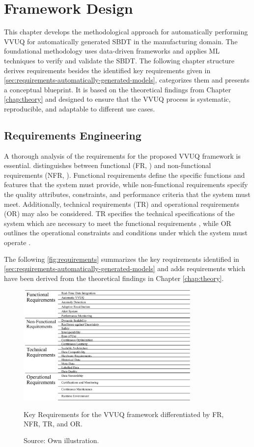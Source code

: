 \chapter{Framework Design}
\label{chap:methodology}
This chapter develops the methodological approach for automatically performing VVUQ for automatically generated SBDT in the manufacturing domain. The foundational methodology uses data-driven frameworks and applies ML techniques to verify and validate the SBDT. The following chapter structure derives requirements besides the identified key requirements given in \autoref{sec:requirements-automatically-generated-models}, categorizes them and presents a conceptual blueprint. It is based on the theoretical findings from Chapter \ref{chap:theory} and designed to ensure that the VVUQ process is systematic, reproducible, and adaptable to different use cases.

\section{Requirements Engineering}
A thorough analysis of the requirements for the proposed VVUQ framework is essential. \Autocite{sindhgatta2005functional} distinguishes between functional (FR, \autocite{van2001goal}) and non-functional requirements (NFR, \autocite{glinz2005rethinking}). Functional requirements define the specific functions and features that the system must provide, while non-functional requirements specify the quality attributes, constraints, and performance criteria that the system must meet. Additionally, technical requirements (TR) and operational requirements (OR) may also be considered. TR specifies the technical specifications of the system which are necessary to meet the functional requirements \autocite{chikh2012new}, while OR outlines the operational constraints and conditions under which the system must operate \autocite{incose2023incose}.

The following \autoref{fig:requirements} summarizes the key requirements identified in \autoref{sec:requirements-automatically-generated-models} and adds requirements which have been derived from the theoretical findings in Chapter \ref{chap:theory}.

\begin{figure}[htbp]
  \centering
  \includegraphics[width=0.8\textwidth]{figures/req.png}
  \caption{Key Requirements for the VVUQ framework differentiated by FR, NFR, TR, and OR. }
  \caption*{Source: Own illustration.}
  \label{fig:requirements}
\end{figure}

